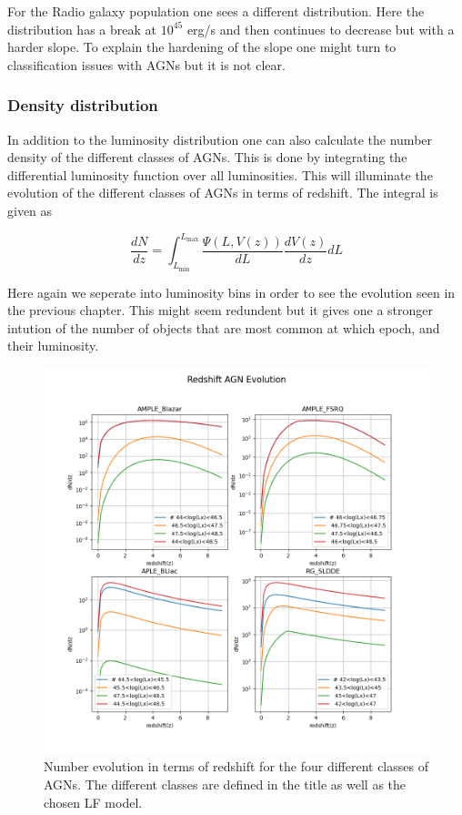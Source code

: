 \documentclass{article}
\begin{document}
For the Radio galaxy population one sees a different distribution. Here the distribution has a break at $10^{45}$ erg/s and then continues to 
decrease but with a harder slope. To explain the hardening of the slope one might turn to classification issues with AGNs but it is not clear.


\subsubsection{Density distribution}

In addition to the luminosity distribution one can also calculate the number density of the different classes of AGNs. This is done by integrating the
differential luminosity function over all luminosities. This will illuminate the evolution of the different classes of AGNs in terms of redshift. The integral is given as

\begin{equation}
    \frac{dN}{dz} = \int_{L_{\text{min}}}^{L_{\text{max}}} \frac{\Psi(L, V(z))}{dL} \frac{dV(z)}{dz} dL
\end{equation}

Here again we seperate into luminosity bins in order to see the evolution seen in the previous chapter. This might seem redundent but
it gives one a stronger intution of the number of objects that are most common at which epoch, and their luminosity. 





\begin{figure}
    \centering
    \includegraphics[width = \textwidth]{Redshift AGN Evolution.png}
    \caption{Number evolution in terms of redshift for the four different classes of AGNs. The different classes are defined in the title as well as the chosen LF model.}
    \label{fig:ND}
\end{figure}
\end{document}
